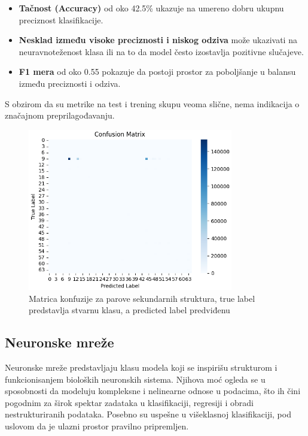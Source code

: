\documentclass[a4paper,12pt]{article}
\begin{document}
\begin{itemize}
    \item \textbf{Tačnost (Accuracy)} od oko 42.5\% ukazuje na umereno dobru ukupnu preciznost klasifikacije.
    \item \textbf{Nesklad između visoke preciznosti i niskog odziva} može ukazivati na neuravnoteženost klasa ili na to da model često izostavlja pozitivne slučajeve.
    \item \textbf{F1 mera} od oko 0.55 pokazuje da postoji prostor za poboljšanje u balansu između preciznosti i odziva.
\end{itemize}
S obzirom da su metrike na test i trening skupu veoma slične, nema indikacija o značajnom preprilagođavanju.

\begin{figure}[htbp]
    \centering
    \includegraphics[width=0.8\textwidth]{./images/conf_mat_ss.png}
    \caption{Matrica konfuzije za parove sekundarnih struktura, true label predstavlja stvarnu klasu, a predicted label predviđenu}
    \label{Slika:confmatss}
\end{figure}

\subsection{Neuronske mreže}

Neuronske mreže predstavljaju klasu modela koji se inspirišu strukturom i funkcionisanjem bioloških neuronskih sistema. Njihova moć ogleda se u sposobnosti da modeluju kompleksne i nelinearne odnose u podacima, što ih čini pogodnim za širok spektar zadataka u klasifikaciji, regresiji i obradi nestrukturiranih podataka. Posebno su uspešne u višeklasnoj klasifikaciji, pod uslovom da je ulazni prostor pravilno pripremljen.
\end{document}
